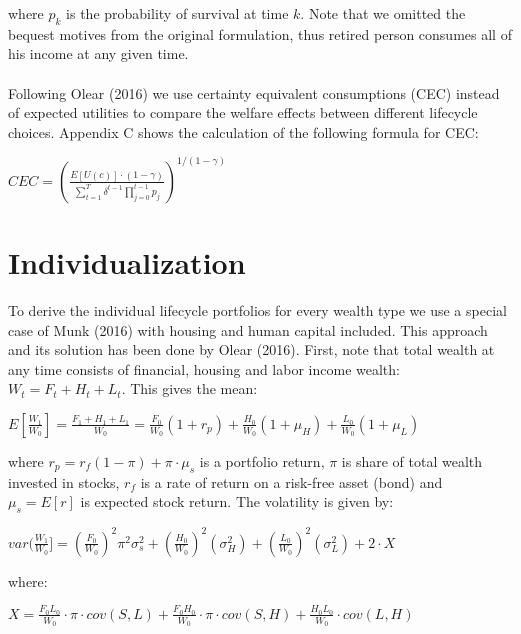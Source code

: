 where $p_k$ is the probability of survival at time $k$. Note that we omitted the bequest motives from the original formulation, thus retired person consumes all of his income at any given time.

\paragraph*{}Following Olear (2016) we use certainty equivalent consumptions (CEC) instead of expected utilities to compare the welfare effects between different lifecycle choices. Appendix C shows the calculation of the following formula for CEC:

\begin{center}
	$CEC = \left( \frac{E[U(c)]\cdot(1-\gamma)}{\sum^T_{t=1} \delta^{t-1} \prod^{t-1}_{j=0} p_j} \right)^{1/(1-\gamma)}$
\end{center}


\section{Individualization}

To derive the individual lifecycle portfolios for every wealth type we use a special case of Munk (2016) with housing and human capital included. This approach and its solution has been done by Olear (2016). First, note that total wealth at any time consists of financial, housing and labor income wealth: $W_t = F_t + H_t + L_t$. This gives the mean:

\begin{center}
	$E[\frac{W_1}{W_0}] = \frac{F_1 + H_1 + L_1}{W_0} =  \frac{F_0}{W_0} (1 + r_p) + \frac{H_0}{W_0}(1+\mu_H) + \frac{L_0}{W_0}(1+\mu_L)$
\end{center}

where $r_p = r_f(1-\pi) + \pi \cdot \mu_s$ is a portfolio return, $\pi$ is share of total wealth invested in stocks, $r_f$ is a rate of return on a risk-free asset (bond) and $\mu_s = E[r]$ is expected stock return. The volatility is given by:

\begin{center}
	$var(\frac{W_1}{W_0}] = (\frac{F_0}{W_0})^2 \pi^2 \sigma^2_s + (\frac{H_0}{W_0})^2(\sigma^2_H) + (\frac{L_0}{W_0})^2(\sigma^2_L) + 2 \cdot X$
\end{center}

where:

\begin{center}
	$X = \frac{F_0 L_0}{W_0} \cdot \pi\cdot cov(S,L) + \frac{F_0 H_0}{W_0} \cdot \pi\cdot cov(S,H) + \frac{H_0 L_0}{W_0} \cdot cov(L,H)$
\end{center}


